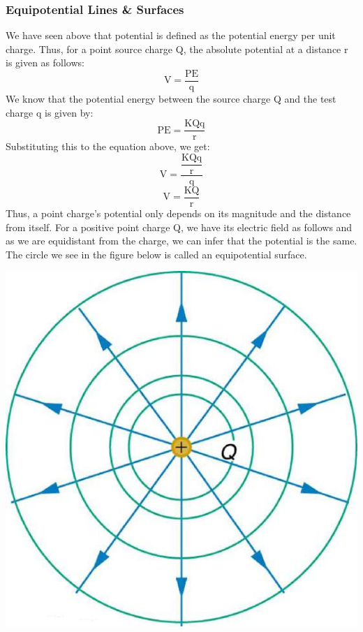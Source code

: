 \documentclass[9pt]{exam}
\begin{document}
	\subsubsection*{Equipotential Lines \& Surfaces}
	We have seen above that potential is defined as the potential energy per unit charge. Thus, for a point source charge Q, the absolute potential at a distance r is given as follows:
	$$\text{V}=\dfrac{\text{PE}}{\text{q}}$$
	We know that the potential energy between the source charge Q and the test charge q is given by:
	$$\text{PE}=\dfrac{\text{KQq}}{\text{r}}$$
	Substituting this to the equation above, we get:
	$$\text{V}=\dfrac{\dfrac{\text{KQq}}{\text{r}}}{\text{q}}$$
	$$\text{V}=\dfrac{\text{KQ}}{\text{r}}$$
	Thus, a point charge's potential only depends on its magnitude and the distance from itself. For a positive point charge Q, we have its electric field as follows and as we are equidistant from the charge, we can infer that the potential is the same. The circle we see in the figure below is called an equipotential surface.\begin{center}
		\includegraphics[scale=0.2]{equip_1}
	\end{center}
\end{document}
